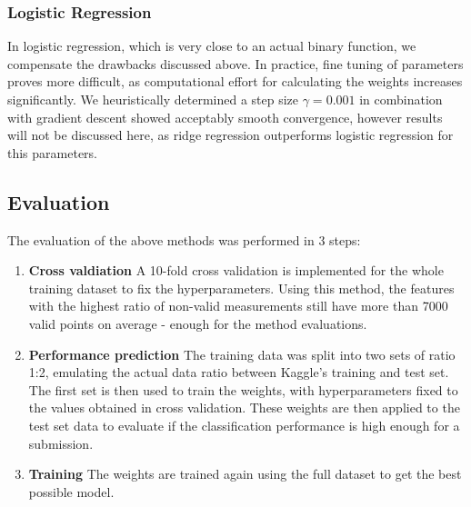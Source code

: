 \subsubsection{Logistic Regression}

In logistic regression, which
is very close to an actual binary function, we compensate the drawbacks discussed above.
In practice, fine tuning of parameters proves more difficult, as computational effort for calculating the weights increases significantly.
We heuristically determined a step size $\gamma=0.001$ in combination with gradient descent showed acceptably smooth convergence, however results will not be discussed here, as ridge regression outperforms logistic regression for this parameters.

\subsection{Evaluation}

The evaluation of the above methods was performed in 3 steps:

\begin{enumerate}
  \item \textbf{Cross valdiation} A 10-fold cross validation is implemented
    for the whole training dataset to
  fix the hyperparameters. Using this method,  the features with the
    highest ratio of non-valid measurements still have more than 7000 valid
    points on average - enough for the method evaluations.
  \item \textbf{Performance prediction} The training data was split into two
    sets of ratio 1:2, emulating the actual data ratio between Kaggle's training and test set. The first set is then used to train the
    weights, with hyperparameters fixed to the values obtained in cross
    validation. These weights are then applied to the test set data to evaluate if the
    classification performance is high enough for a submission. 
  \item \textbf{Training} The
    weights are trained again using the full  dataset to get the best
    possible model.
\end{enumerate}

